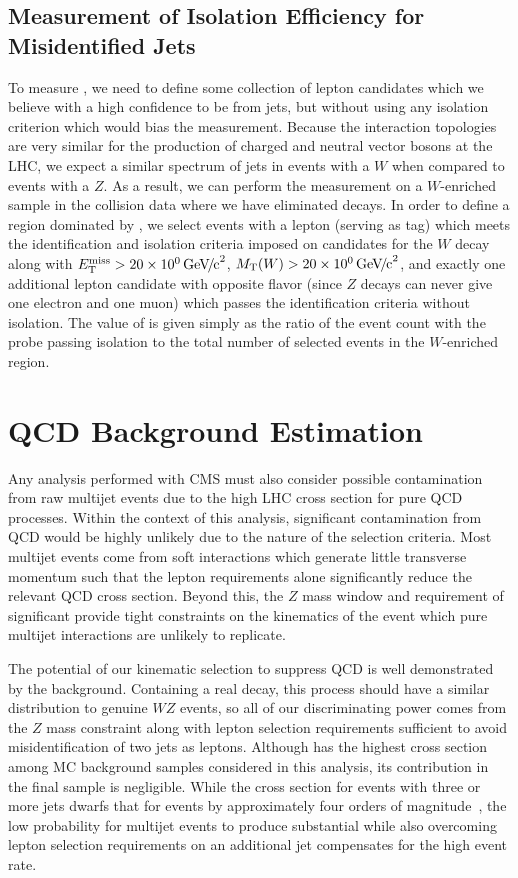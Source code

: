 \subsection{Measurement of Isolation Efficiency for Misidentified Jets}
To measure \pfake{}, we need to define some collection of lepton candidates which we believe with a high confidence to be from jets, but without using any isolation criterion which would bias the measurement.  Because the interaction topologies are very similar for the production of charged and neutral vector bosons at the LHC, we expect a similar spectrum of jets in events with a $W$ when compared to events with a $Z$.  As a result, we can perform the \pfake{} measurement on a $W$-enriched sample in the collision data where we have eliminated \ztoll{} decays.  In order to define a region dominated by \Wjets, we select events with a lepton (serving as tag) which meets the identification and isolation criteria imposed on candidates for the $W$ decay along with $E_{\mathrm{T}}^{\mathrm{miss}} > \SI{20}{\ensuremath{{\text{Ge\hspace{-.08em}V\hspace{-0.16em}/\hspace{-0.08em}c}^\text{2}}}}$, $M_{\mathrm{T}}(W) > \SI{20}{\ensuremath{{\text{Ge\hspace{-.08em}V\hspace{-0.16em}/\hspace{-0.08em}c}^\text{2}}}}$, and exactly one additional lepton candidate with opposite flavor (since $Z$ decays can never give one electron and one muon) which passes the identification criteria without isolation.  The value of \pfake{} is given simply as the ratio of the event count with the probe passing isolation to the total number of selected events in the $W$-enriched region.

\section{QCD Background Estimation}

Any analysis performed with CMS must also consider possible contamination from raw multijet events due to the high LHC cross section for pure QCD processes.  Within the context of this analysis, significant contamination from QCD would be highly unlikely due to the nature of the selection criteria.  Most multijet events come from soft interactions which generate little transverse momentum such that the lepton \pt requirements alone significantly reduce the relevant QCD cross section.  Beyond this, the $Z$ mass window and requirement of significant \MET{} provide tight constraints on the kinematics of the event which pure multijet interactions are unlikely to replicate.

The potential of our kinematic selection to suppress QCD is well demonstrated by the \Wjets{} background.  Containing a real \wtolnu{} decay, this process should have a similar \MET distribution to genuine $WZ$ events, so all of our discriminating power comes from the $Z$ mass constraint along with lepton selection requirements sufficient to avoid misidentification of two jets as leptons.  Although \Wjets{} has the highest cross section among MC background samples considered in this analysis, its contribution in the final sample is negligible.  While the cross section for events with three or more jets dwarfs that for \Wjets{} events by approximately four orders of magnitude~\cite{LopezMateos}, the low probability for multijet events to produce substantial \MET while also overcoming lepton selection requirements on an additional jet compensates for the high event rate.

